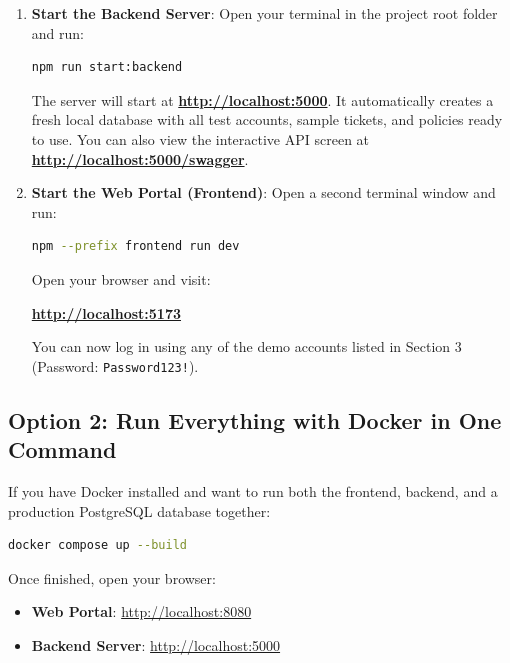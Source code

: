 \documentclass[a4paper,11pt]{article}
\begin{document}
\begin{enumerate}
    \item \textbf{Start the Backend Server}:
    Open your terminal in the project root folder and run:
    \begin{lstlisting}[language=bash]
    npm run start:backend
    \end{lstlisting}
    \begin{tipbox}
    The server will start at \textbf{\url{http://localhost:5000}}. It automatically creates a fresh local database with all test accounts, sample tickets, and policies ready to use. You can also view the interactive API screen at \textbf{\url{http://localhost:5000/swagger}}.
    \end{tipbox}

    \item \textbf{Start the Web Portal (Frontend)}:
    Open a second terminal window and run:
    \begin{lstlisting}[language=bash]
    npm --prefix frontend run dev
    \end{lstlisting}
    Open your browser and visit:
    \begin{center}
    \textbf{\url{http://localhost:5173}}
    \end{center}
    You can now log in using any of the demo accounts listed in Section 3 (Password: \texttt{Password123!}).
\end{enumerate}

\subsection{Option 2: Run Everything with Docker in One Command}

If you have Docker installed and want to run both the frontend, backend, and a production PostgreSQL database together:

\begin{lstlisting}[language=bash]
docker compose up --build
\end{lstlisting}

Once finished, open your browser:
\begin{itemize}
    \item \textbf{Web Portal}: \url{http://localhost:8080}
    \item \textbf{Backend Server}: \url{http://localhost:5000}
\end{itemize}

\end{document}
